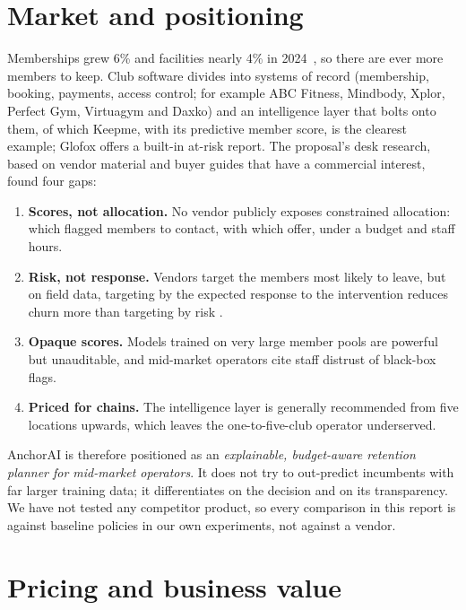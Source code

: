 \section{Market and positioning}

Memberships grew 6\% and facilities nearly 4\% in 2024~\cite{hfa2025global}, so there are ever more members to keep. Club software divides into systems of record (membership, booking, payments, access control; for example ABC Fitness, Mindbody, Xplor, Perfect Gym, Virtuagym and Daxko) and an intelligence layer that bolts onto them, of which Keepme, with its predictive member score, is the clearest example; Glofox offers a built-in at-risk report. The proposal's desk research, based on vendor material and buyer guides that have a commercial interest, found four gaps:

\begin{enumerate}
  \item \textbf{Scores, not allocation.} No vendor publicly exposes constrained allocation: which flagged members to contact, with which offer, under a budget and staff hours.
  \item \textbf{Risk, not response.} Vendors target the members most likely to leave, but on field data, targeting by the expected response to the intervention reduces churn more than targeting by risk \cite{ascarza2018futility}.
  \item \textbf{Opaque scores.} Models trained on very large member pools are powerful but unauditable, and mid-market operators cite staff distrust of black-box flags.
  \item \textbf{Priced for chains.} The intelligence layer is generally recommended from five locations upwards, which leaves the one-to-five-club operator underserved.
\end{enumerate}

AnchorAI is therefore positioned as an \emph{explainable, budget-aware retention planner for mid-market operators}. It does not try to out-predict incumbents with far larger training data; it differentiates on the decision and on its transparency. We have not tested any competitor product, so every comparison in this report is against baseline policies in our own experiments, not against a vendor.

\section{Pricing and business value}
\label{sec:pricing}

